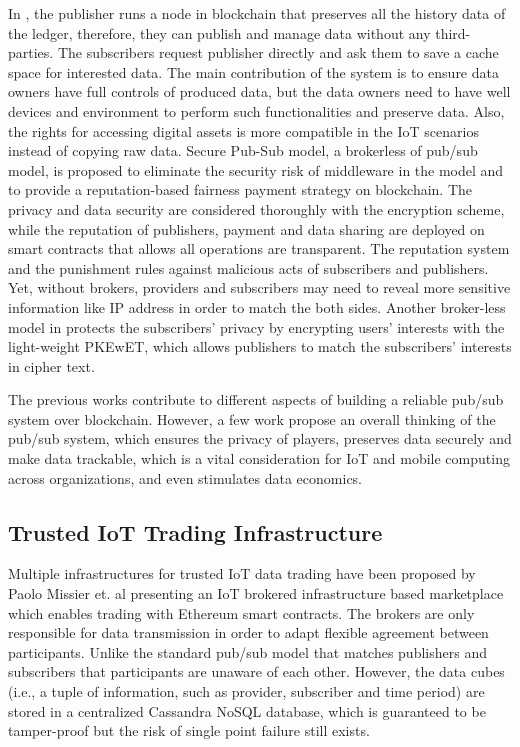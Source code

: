 \documentclass[conference]{IEEEtran}
\begin{document}
In \cite{userCentricData}, the publisher runs a node in blockchain that preserves all the history data of the ledger, therefore, they can publish and manage data without any third-parties. The subscribers request publisher directly and ask them to save a cache space for interested data. The main contribution of the system is to ensure data owners have full controls of produced data, but the data owners need to have well devices and environment to perform such functionalities and preserve data. Also, the rights for accessing digital assets is more compatible in the IoT scenarios instead of copying raw data. Secure Pub-Sub model\cite{SPS}, a brokerless of pub/sub model, is proposed to eliminate the security risk of middleware in the model and to provide a reputation-based fairness payment strategy on blockchain. The privacy and data security are considered thoroughly with the encryption scheme, while the reputation of publishers, payment and data sharing are deployed on smart contracts that allows all operations are transparent. The reputation system and the punishment rules against malicious acts of subscribers and publishers. Yet, without brokers, providers and subscribers may need to reveal more sensitive information like IP address in order to match the both sides. Another broker-less model in \cite{PrivacyPreservPubSub} protects the subscribers' privacy by encrypting users' interests with the light-weight PKEwET\cite{PKEwET}, which allows publishers to match the subscribers' interests in cipher text.

The previous works contribute to different aspects of building a reliable pub/sub system over blockchain. However, a few work propose an overall thinking of the pub/sub system, which ensures the privacy of players, preserves data securely and make data trackable, which is a vital consideration for IoT and mobile computing across organizations, and even stimulates data economics.

\subsection{Trusted IoT Trading Infrastructure}
Multiple infrastructures for trusted IoT data trading have been proposed by Paolo Missier et. al\cite{MindMyValue} presenting an IoT brokered infrastructure based marketplace which enables trading with Ethereum smart contracts. The brokers are only responsible for data transmission in order to adapt flexible agreement between participants. Unlike the standard pub/sub model that matches publishers and subscribers that participants are unaware of each other. However, the data cubes (i.e., a tuple of information, such as provider, subscriber and time period) are stored in a centralized Cassandra NoSQL database, which is guaranteed to be tamper-proof but the risk of single point failure still exists.
\end{document}
